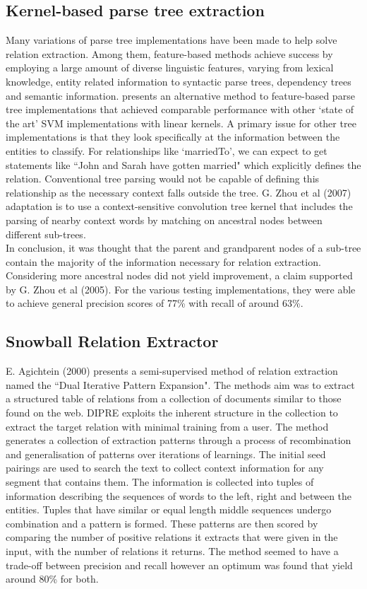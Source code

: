 \documentclass[12pt]{article} %
\begin{document}
\subsection{Kernel-based parse tree extraction}
Many variations of parse tree implementations have been made to help solve relation extraction. Among them, feature-based methods achieve success by employing a large amount of diverse linguistic features, varying from lexical knowledge, entity related information to syntactic parse trees, dependency trees and semantic information\cite{combining}\cite{exploringVarious}. \cite{treeKernel} presents an alternative method to feature-based parse tree implementations that achieved comparable performance with other ‘state of the art’ SVM implementations with linear kernels. A primary issue for other tree implementations is that they look specifically at the information between the entities to classify. For relationships like ‘marriedTo’, we can expect to get statements like ``John and Sarah have gotten married" which explicitly defines the relation. Conventional tree parsing would not be capable of defining this relationship as the necessary context falls outside the tree. G. Zhou et al (2007) adaptation is to use a context-sensitive convolution tree kernel that includes the parsing of nearby context words by matching on ancestral nodes between different sub-trees.\\

In conclusion, it was thought that the parent and grandparent nodes of a sub-tree contain the majority of the information necessary for relation extraction. Considering more ancestral nodes did not yield improvement, a claim supported by G. Zhou et al (2005). For the various testing implementations, they were able to achieve general precision scores of 77\% with recall of around 63\%.

\subsection{Snowball Relation Extractor}

E. Agichtein (2000) presents a semi-supervised method of relation extraction named the ``Dual Iterative Pattern Expansion". The methods aim was to extract a structured table of relations from a collection of documents similar to those found on the web. DIPRE exploits the inherent structure in the collection to extract the target relation with minimal training from a user. The method generates a collection of extraction patterns through a process of recombination and generalisation of patterns over iterations of learnings. The initial seed pairings are used to search the text to collect context information for any segment that contains them. The information is collected into tuples of information describing the sequences of words to the left, right and between the entities. Tuples that have similar or equal length middle sequences undergo combination and a pattern is formed. These patterns are then scored by comparing the number of positive relations it extracts that were given in the input, with the number of relations it returns. The method seemed to have a trade-off between precision and recall however an optimum was found that yield around 80\% for both.
\end{document}
